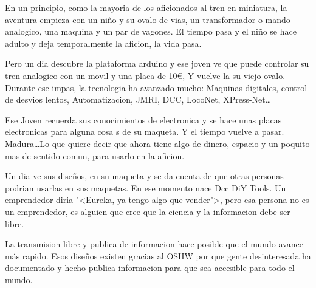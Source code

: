 
En un principio, como la mayoria de los aficionados al tren en miniatura, la aventura empieza con un niño y su ovalo de vias, un transformador o mando analogico, una maquina y un par de vagones. El tiempo pasa y el niño se hace adulto y deja temporalmente la aficion, la vida pasa. 

Pero un dia descubre la plataforma arduino y ese joven ve que puede controlar su tren analogico con un movil y una placa de 10€, Y vuelve la su viejo ovalo.
Durante ese impas, la tecnologia ha avanzado mucho: Maquinas digitales, control de desvios lentos, Automatizacion, JMRI, DCC, LocoNet, XPress-Net\dots

Ese Joven recuerda sus conocimientos de electronica y se hace unas placas electronicas para alguna cosa s de su maqueta. Y el tiempo vuelve a pasar. Madura\dots Lo que quiere decir que ahora tiene algo de dinero, espacio y un poquito mas de sentido comun, para usarlo en la aficion.

Un dia ve sus diseños, en su maqueta y se da cuenta de que otras personas podrian usarlas en sus maquetas. En ese momento nace Dcc DiY Tools. Un emprendedor diria "<Eureka, ya tengo algo que vender">, pero esa persona no es un emprendedor, es alguien que cree que la ciencia y la informacion debe ser libre.

La transmision libre y publica de informacion hace posible que el mundo avance más rapido.
Esos diseños existen gracias al OSHW por que gente desinteresada ha documentado y hecho publica informacion para que sea accesible para todo el mundo.